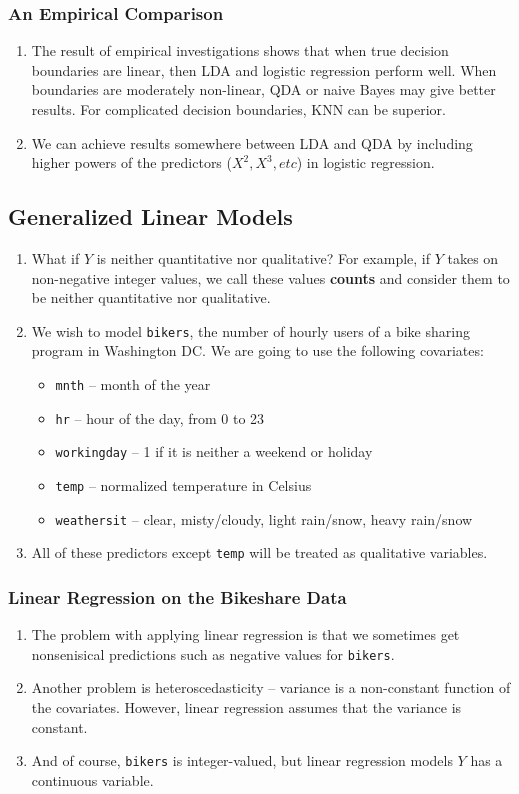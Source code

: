 \documentclass[10pt]{article}
\begin{document}
\subsubsection{An Empirical Comparison} 
\begin{enumerate}
	\item The result of empirical investigations shows that when true decision boundaries are linear, then LDA and logistic regression perform well.  When boundaries are moderately non-linear, QDA or naive Bayes may give better results.  For complicated decision boundaries, KNN can be superior.
	\item We can achieve results somewhere between LDA and QDA by including higher powers of the predictors ($X^2, X^3, etc$) in logistic regression.
\end{enumerate}

\subsection{Generalized Linear Models} 
\begin{enumerate}
	\item What if $Y$ is neither quantitative nor qualitative?  For example, if $Y$ takes on non-negative integer values, we call these values \textbf{counts} and consider them to be neither quantitative nor qualitative. 
	\item We wish to model {\tt bikers}, the number of hourly users of a bike sharing program in Washington DC.  We are going to use the following covariates: \begin{itemize}
		\item {\tt mnth} -- month of the year
		\item {\tt hr} -- hour of the day, from 0 to 23
		\item {\tt workingday} -- 1 if it is neither a weekend or holiday
		\item {\tt temp} -- normalized temperature in Celsius
		\item {\tt weathersit} -- clear, misty/cloudy, light rain/snow, heavy rain/snow
	\end{itemize}
	\item All of these predictors except {\tt temp} will be treated as qualitative variables.
\end{enumerate}
\subsubsection{Linear Regression on the Bikeshare Data} 
\begin{enumerate}
	\item The problem with applying linear regression is that we sometimes get nonsenisical predictions such as negative values for {\tt bikers}.  
	\item Another problem is heteroscedasticity -- variance is a non-constant function of the covariates.  However, linear regression assumes that the variance is constant.
	\item And of course, {\tt bikers} is integer-valued, but linear regression models $Y$ has a continuous variable.  
\end{enumerate}
\end{document}
